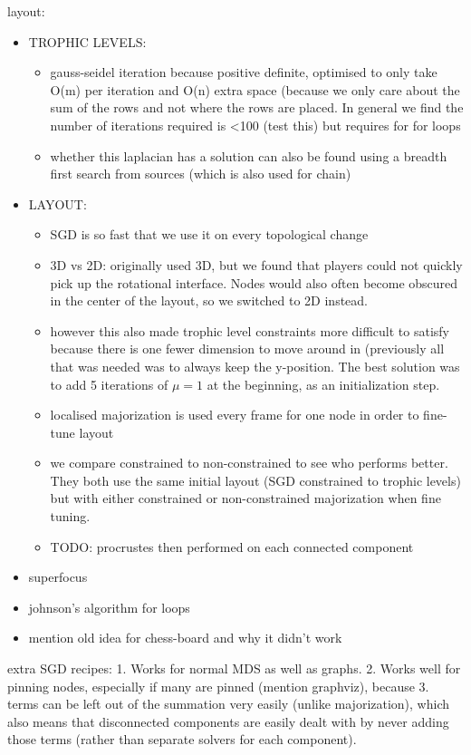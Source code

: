 layout:
\begin{itemize}
    \item TROPHIC LEVELS:
    \begin{itemize}
        \item gauss-seidel iteration because positive definite, optimised to only take O(m) per iteration and O(n) extra space (because we only care about the sum of the rows and not where the rows are placed. In general we find the number of iterations required is <100 (test this) but requires for for loops
        \item whether this laplacian has a solution can also be found using a breadth first search from sources (which is also used for chain)
    \end{itemize}
    \item LAYOUT:
    \begin{itemize}
        \item SGD is so fast that we use it on every topological change
        \item 3D vs 2D: originally used 3D, but we found that players could not quickly pick up the rotational interface. Nodes would also often become obscured in the center of the layout, so we switched to 2D instead. 
        \item however this also made trophic level constraints more difficult to satisfy because there is one fewer dimension to move around in (previously all that was needed was to always keep the y-position. The best solution was to add 5 iterations of $\mu=1$ at the beginning, as an initialization step.
        \item localised majorization is used every frame for one node in order to fine-tune layout
        \item we compare constrained to non-constrained to see who performs better. They both use the same initial layout (SGD constrained to trophic levels) but with either constrained or non-constrained majorization when fine tuning.
        \item TODO: procrustes then performed on each connected component
    \end{itemize}
    
    \item superfocus
    \item johnson's algorithm for loops
    \item mention old idea for chess-board and why it didn't work
\end{itemize}

extra SGD recipes: 1. Works for normal MDS as well as graphs. 2. Works well for pinning nodes, especially if many are pinned (mention graphviz), because 3. terms can be left out of the summation very easily (unlike majorization), which also means that disconnected components are easily dealt with by never adding those terms (rather than separate solvers for each component).

